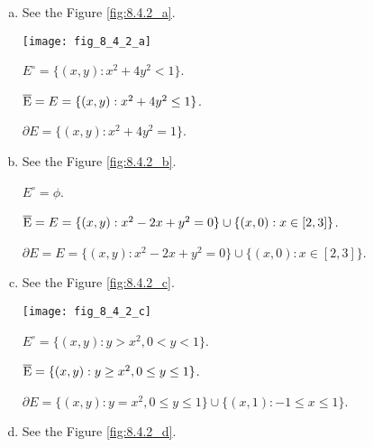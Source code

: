 \begin{Exercise}
\begin{enumerate}[a)]
\item
\begin{sketch} 
See the Figure \ref{fig:8.4.2_a}.

\begin{minipage}[h]{\textwidth}
\centering
\texttt{[image: fig\_8\_4\_2\_a]}
\label{fig:8.4.2_a}
\end{minipage}

$E^\circ = \{(x,y):x^2+4y^2< 1\}$.

$\overline{\rm E} = E = \{(x,y):x^2+4y^2 \leq 1\}$.

$\partial E = \{(x,y):x^2+4y^2 = 1\}$.
\end{sketch}

\item
\begin{sketch} 
See the Figure \ref{fig:8.4.2_b}.

\begin{minipage}[h]{\textwidth}
\centering

\label{fig:8.4.2_b}
\end{minipage}

$E^\circ = \phi$.

$\overline{\rm E} = E = \{(x,y):x^2-2x+y^2=0\}\cup\{(x,0):x\in[2,3]\}$.

$\partial E = E = \{(x,y):x^2-2x+y^2=0\}\cup\{(x,0):x\in[2,3]\}$.
\end{sketch}

\item
\begin{sketch} 
See the Figure \ref{fig:8.4.2_c}.

\begin{minipage}[h]{\textwidth}
\centering
\texttt{[image: fig\_8\_4\_2\_c]}
\label{fig:8.4.2_c}
\end{minipage}

$E^\circ = \{(x,y):y>x^2,0<y<1\}$.

$\overline{\rm E} = \{(x,y):y\geq x^2, 0\leq y \leq 1\}$.

$\partial E = \{(x,y):y=x^2,0\leq y \leq 1\}\cup\{(x,1):-1\leq x\leq 1\}$.
\end{sketch}

\item
\begin{sketch} 
See the Figure \ref{fig:8.4.2_d}.


\end{sketch}
\end{enumerate}
\end{Exercise}
